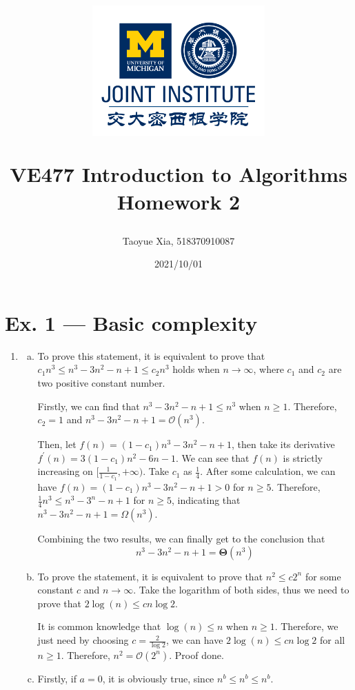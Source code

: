 \documentclass[12pt, a4paper]{article}
\title{
    \begin{figure}[H]
        \centering
        \includegraphics[width=7cm, height=5cm]{AAA.png}
    \end{figure}
    VE477 Introduction to Algorithms\\ 
    Homework 2}
\author{Taoyue Xia, 518370910087}
\date{2021/10/01}
\begin{document}
\maketitle

\newpage

\section*{Ex. 1 --- Basic complexity}
\begin{enumerate}
    \item \begin{enumerate}[a)]
        \item To prove this statement, it is equivalent to prove that $c_1 n^3 \leq n^3 - 3n^2 - n + 1 \leq c_2 n^3$ holds when $n \rightarrow \infty$, 
              where $c_1$ and $c_2$ are two positive constant number.

              Firstly, we can find that $n^3 - 3n^2 - n + 1 \leq n^3$ when $n \geq 1$. Therefore, $c_2 = 1$ and $n^3 - 3n^2 - n + 1 = \mathcal{O}(n^3)$.

              Then, let $f(n) = (1 - c_1)n^3 - 3n^2 - n + 1$, then take its derivative $f^\prime(n) = 3(1 - c_1)n^2 - 6n - 1$. 
              We can see that $f(n)$ is strictly increasing on $[\frac{1}{1-c_1}, +\infty)$. Take $c_1$ as $\frac{1}{4}$. 
              After some calculation, we can have $f(n) = (1 - c_1)n^3 - 3n^2 - n + 1 > 0$ for $n \geq 5$. 
              Therefore, $\frac{1}{4}n^3 \leq n^3 - 3^n - n + 1$ for $n \geq 5$, indicating that $n^3 - 3n^2 - n + 1 = \Omega(n^3)$.

              Combining the two results, we can finally get to the conclusion that
              $$n^3 - 3n^2 - n + 1 = \boldsymbol{\Theta}(n^3)$$
        
        \item To prove the statement, it is equivalent to prove that $n^2 \leq c2^n$ for some constant $c$ and $n\rightarrow \infty$. 
              Take the logarithm of both sides, thus we need to prove that $2\log(n) \leq cn\log 2$.

              It is common knowledge that $\log(n) \leq n$ when $n \geq 1$. Therefore, we just need by choosing $c = \frac{2}{\log2}$, 
              we can have $2\log(n) \leq cn\log 2$ for all $n \geq 1$. Therefore, $n^2 = \mathcal{O}(2^n)$. Proof done.
        
        \item Firstly, if $a = 0$, it is obviously true, since $n^b \leq n^b \leq n^b$. 
        

\end{enumerate}
\end{enumerate}
\end{document}
